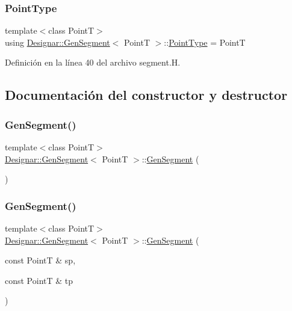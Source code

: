\subsubsection{\texorpdfstring{Point\+Type}{PointType}}
{\footnotesize\ttfamily template$<$class PointT$>$ \\
using \hyperlink{class_designar_1_1_gen_segment}{Designar\+::\+Gen\+Segment}$<$ PointT $>$\+::\hyperlink{class_designar_1_1_gen_segment_a411a0e6d28251be878c23ad4dbec71bb}{Point\+Type} =  PointT}



Definición en la línea 40 del archivo segment.\+H.



\subsection{Documentación del constructor y destructor}
\mbox{\label{class_designar_1_1_gen_segment_ab57969fe5adbc572d437709946c0999d}} 
\subsubsection{\texorpdfstring{Gen\+Segment()}{GenSegment()}\hspace{0.1cm}{\footnotesize\ttfamily [1/7]}}
{\footnotesize\ttfamily template$<$class PointT$>$ \\
\hyperlink{class_designar_1_1_gen_segment}{Designar\+::\+Gen\+Segment}$<$ PointT $>$\+::\hyperlink{class_designar_1_1_gen_segment}{Gen\+Segment} (\begin{DoxyParamCaption}{ }\end{DoxyParamCaption})\hspace{0.3cm}{\ttfamily [default]}}

\mbox{\label{class_designar_1_1_gen_segment_a3735dbb7660ebba6d82a977eaee42ed8}} 
\subsubsection{\texorpdfstring{Gen\+Segment()}{GenSegment()}\hspace{0.1cm}{\footnotesize\ttfamily [2/7]}}
{\footnotesize\ttfamily template$<$class PointT$>$ \\
\hyperlink{class_designar_1_1_gen_segment}{Designar\+::\+Gen\+Segment}$<$ PointT $>$\+::\hyperlink{class_designar_1_1_gen_segment}{Gen\+Segment} (\begin{DoxyParamCaption}\item[{const PointT \&}]{sp,  }\item[{const PointT \&}]{tp }\end{DoxyParamCaption})\hspace{0.3cm}{\ttfamily [inline]}}



